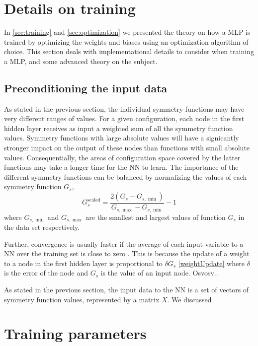 \documentclass[twoside,english]{uiofysmaster}
\begin{document}
\section{Details on training}
In \autoref{sec:training} and \autoref{sec:optimization} we presented the theory on how a MLP is trained 
by optimizing the weights and biases using an optimization algorithm of choice. 
This section deals with implementational details to consider when training a MLP, and some advanced theory on the subject. 

\subsection{Preconditioning the input data}
As stated in the previous section, the individual symmetry functions may have very different ranges of values. 
For a given configuration, each node in the first hidden layer receives as input a weighted sum of all the symmetry function values.
Symmetry functions with large absolute values will have a signicantly stronger impact on the output of these nodes than 
functions with small absolute values. Consequentially, the areas of configuration space covered by the latter functions
may take a longer time for the NN to learn. The importance of the different symmetry functions can be balanced
by normalizing the values \cite{Behler15} of each symmetry function $G_s$, 
\begin{equation}
 G_s^{\mathrm{scaled}} = \frac{2(G_s - G_{s,\min})}{G_{s,\max} - G_{s,\min}} - 1
\end{equation}
where $G_{s,\min}$ and $G_{s,\max}$ are the smallest and largest values of function $G_s$ in the data set respectively.

Further, convergence is usually faster if the average of each input variable to a NN over the 
training set is close to zero \cite{LeCun98}.
This is because the update of a weight to a node in the first hidden layer is proportional 
to $\delta G_s$ \eqref{weightUpdate} where $\delta$ is the error of the node and $G_s$ is the value of an input node. 
Osvosv..



As stated in the previous section, the input data to the NN is a set of vectors of symmetry function values, represented by a matrix $X$.
We discussed 


\section{Training parameters}
\end{document}
